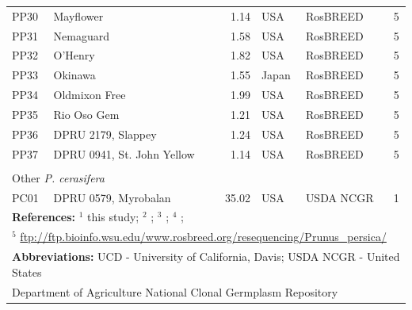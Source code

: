 \documentclass[12pt]{article}
\begin{document}
\begin{center}
\begin{longtable}{llrllc}
	PP30 &Mayflower &1.14 &USA &RosBREED &5\\
	PP31 &Nemaguard &1.58 &USA &RosBREED &5\\
	PP32 &O'Henry &1.82 &USA &RosBREED &5\\
	PP33 &Okinawa &1.55 &Japan &RosBREED &5\\
	PP34 &Oldmixon Free &1.99 &USA &RosBREED &5\\
	PP35 &Rio Oso Gem &1.21 &USA &RosBREED &5\\
	PP36 &DPRU 2179, Slappey &1.24 &USA &RosBREED &5\\
	PP37 &DPRU 0941, St. John Yellow &1.14 &USA &RosBREED &5\\
	\\
	\multicolumn{6}{l}{Other \emph{P. cerasifera}}  \\
	PC01 & DPRU 0579, Myrobalan &35.02 &USA &USDA NCGR &1\\
 \hline \hline
	\multicolumn{6}{l}{\textbf{References:} $^{1}$ this study; $^{2}$ \citealp{koepke2013comparative}; $^{3}$ \citealp{verde2013high}; $^{4}$ \citealp{ahmad2011whole};}\\
	\multicolumn{6}{l}{$^{5}$ \url{ftp://ftp.bioinfo.wsu.edu/www.rosbreed.org/resequencing/Prunus_persica/}}\\
	\multicolumn{6}{l}{\textbf{Abbreviations:} UCD - University of California, Davis; USDA NCGR - United States}\\
	\multicolumn{6}{l}{Department of Agriculture National Clonal Germplasm Repository}
\end{longtable}
\end{center}
\end{document}
